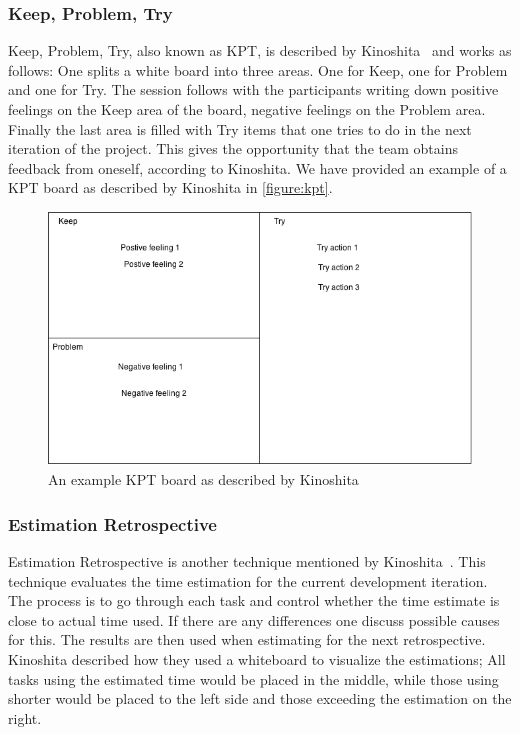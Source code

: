 \documentclass[12pt]{article}
\begin{document}
\subsubsection{Keep, Problem, Try}
Keep, Problem, Try, also known as KPT, is described by Kinoshita~\cite{Kinoshita2008} and works as follows: One splits a white board into three areas. One for Keep, one for Problem and one for Try. The session follows with the participants writing down positive feelings on the Keep area of the board, negative feelings on the Problem area. Finally the last area is filled with Try items that one tries to do in the next iteration of the project. This gives the opportunity that the team obtains feedback from oneself, according to Kinoshita. We have provided an example of a KPT board as described by Kinoshita in \autoref{figure:kpt}. 

\begin{figure}[h!]
	\centering
	\includegraphics[width=\textwidth]{figures/kpt.png}
	\caption{An example KPT board as described by Kinoshita ~\cite{Kinoshita2008}}
	\label{figure:kpt}
\end{figure}

\subsubsection{Estimation Retrospective}
Estimation Retrospective is another technique mentioned by Kinoshita~\cite{Kinoshita2008}. This technique evaluates the time estimation for the current development iteration. The process is to go through each task and control whether the time estimate is close to actual time used. If there are any differences one discuss possible causes for this. The results are then used when estimating for the next retrospective. Kinoshita described how they used a whiteboard to visualize the estimations; All tasks using the estimated time would be placed in the middle, while those using shorter would be placed to the left side and those exceeding the estimation on the right. 
\end{document}
